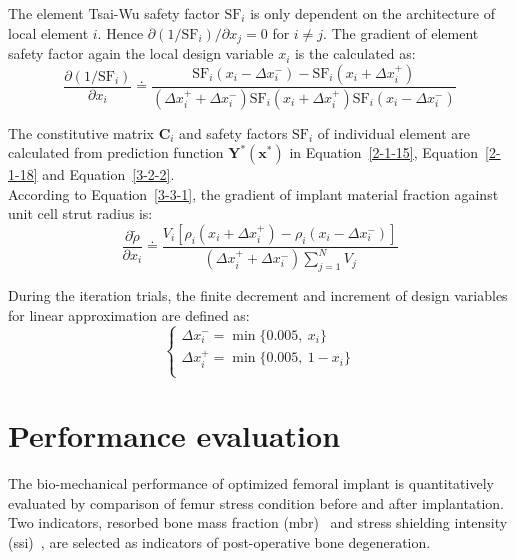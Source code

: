 \documentclass[12pt]{extbook}
\begin{document}
The element Tsai-Wu safety factor $\text{SF}_i$ is only dependent on the architecture of local element $i$. Hence $\partial (1/\text{SF}_i) / \partial x_j = 0$ for $i \neq j$. The gradient of element safety factor again the local design variable $x_i$ is the calculated as:
\begin{equation}
\frac{\partial (1/\text{SF}_i)}{\partial x_i} \doteq \frac{\text{SF}_i(x_i - \Delta x_i^-) - \text{SF}_i(x_i + \Delta x_i^+)}{(\Delta x_i^+ + \Delta x_i^-)\text{SF}_i(x_i + \Delta x_i^+) \text{SF}_i(x_i - \Delta x_i^-)}
\label{3-3-7}
\end{equation}

The constitutive matrix $\bm{C}_i$ and safety factors $\text{SF}_i$ of individual element are calculated from prediction function $\bm{Y}^*(\bm{x}^*)$ in Equation~\ref{2-1-15}, Equation~\ref{2-1-18} and Equation~\ref{3-2-2}.\\

According to Equation~\ref{3-3-1}, the gradient of implant material fraction against unit cell strut radius is:
\begin{equation}
\frac{\partial \tilde{\rho}}{\partial x_i} \doteq \frac{V_i[\rho_i(x_i + \Delta x_i^+)-\rho_i(x_i - \Delta x_i^-)]}{(\Delta x_i^+ + \Delta x_i^-)\sum_{j=1}^N V_j}
\label{3-4-6}
\end{equation}

During the iteration trials, the finite decrement and increment of design variables for linear approximation are defined as:
\begin{equation}
\left\{
\begin{array}{l}
\Delta x_i^- = \min\{0.005,~x_i\}\\
\Delta x_i^+ = \min\{0.005,~1 - x_i\}\\
\end{array}
\right.
\label{3-4-7}
\end{equation}

\section{Performance evaluation}
\label{femur_perf}

The bio-mechanical performance of optimized femoral implant is quantitatively evaluated by comparison of femur stress condition before and after implantation. Two indicators, resorbed bone mass fraction (mbr)~\cite{kuiper1992numerical} and stress shielding intensity (ssi)~\cite{boyle2011comparison}, are selected as indicators of post-operative bone degeneration.\\
\end{document}
